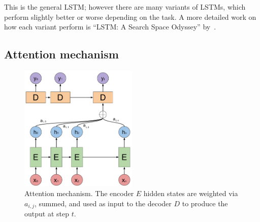 
This is the general LSTM; however there are many variants of LSTMs, which perform slightly better or worse depending on the task. A more detailed work on how each variant perform is ``LSTM: A Search Space Odyssey'' by~\citet{greff2017lstm}.


\subsection{Attention mechanism}

\begin{figure}[t]
        \centering
        \includegraphics[width=0.5\textwidth]{images/Attention.pdf}
        \caption{Attention mechanism. The encoder $E$ hidden states are weighted via $a_{i, j}$, summed, and used as input to the decoder $D$ to produce the output at step $t$.}
        \label{fig:attention}
\end{figure}%

